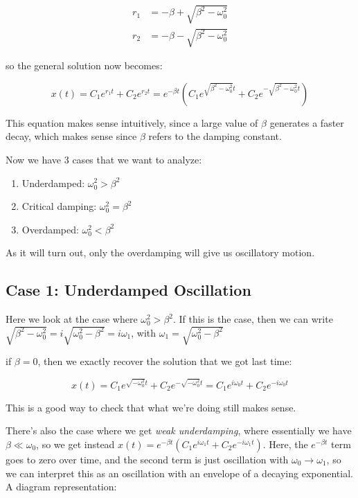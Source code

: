 \begin{align*}
    r_1 &= -\beta + \sqrt{\beta^2 - \omega_0^2}\\
    r_2 &= -\beta - \sqrt{\beta^2 - \omega_0^2}
\end{align*}

so the general solution now becomes: 

\[ x(t) = C_1e^{r_1t} + C_2e^{r_2t} = e^{-\beta t} \left( C_1e^{\sqrt{\beta^2 - \omega_0^2} t } + C_2e^{-\sqrt{\beta^2 - \omega_0^2}t}\right)\]

This equation makes sense intuitively, since a large value of $\beta$ generates a faster decay, which makes sense since $\beta$ refers to the damping constant. 

Now we have 3 cases that we want to analyze: 

\begin{enumerate}[label = (\alph*)]
    \item Underdamped: $\omega_0^2 > \beta^2$ 
    \item Critical damping: $\omega_0^2 = \beta^2$
    \item Overdamped: $\omega_0^2 < \beta^2$
\end{enumerate}

As it will turn out, only the overdamping will give us oscillatory motion.

\subsection{Case 1: Underdamped Oscillation} 

Here we look at the case where $\omega_0^2 > \beta^2$. If this is the case, then we can write $\sqrt{\beta^2 - \omega_0^2} = i\sqrt{\omega_0^2 - \beta^2} = i\omega_1$, with $\omega_1 = \sqrt{\omega_0^2 - \beta^2}$

\begin{insight*}{}{}
    if $\beta = 0$, then we exactly recover the solution that we got last time: 

    \[ x(t) = C_1e^{\sqrt{-\omega_0^2}t} + C_2e^{-\sqrt{-\omega_0^2}t} = C_1e^{i\omega_0t} + C_2e^{-i\omega_0t}\]

    This is a good way to check that what we're doing still makes sense.
\end{insight*}

There's also the case where we get \textit{weak underdamping}, where essentially we have $\beta \ll \omega_0$, so we get instead $x(t) = e^{-\beta t}\left(C_1e^{i\omega_1t} + C_2e^{-i\omega_1t}\right)$. Here, the $e^{-\beta t}$ term goes to zero over time, and the second term is just oscillation with $\omega_0 \to \omega_1$, so we can interpret this as an oscillation with an envelope of a decaying exponential. A diagram representation: 


